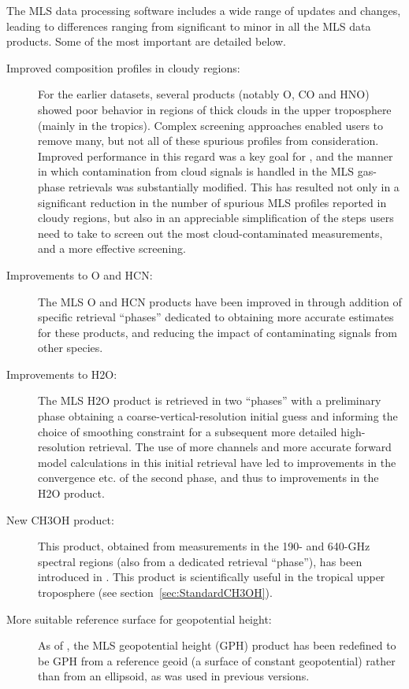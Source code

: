 \documentclass[11pt,draft]{report}
\begin{document}
The MLS \thisv data processing software includes a wide range of updates
and changes, leading to differences ranging from significant to minor in
all the MLS data products.  Some of the most important are detailed
below.

\begin{description}
\item[Improved composition profiles in cloudy regions:] For the earlier
  \prevv datasets, several products (notably O, CO and HNO)
  showed poor behavior in regions of thick clouds in the upper
  troposphere (mainly in the tropics).  Complex screening approaches
  enabled users to remove many, but not all of these spurious profiles
  from consideration.  Improved performance in this regard was a key
  goal for \thisv, and the manner in which contamination from cloud
  signals is handled in the MLS gas-phase retrievals was substantially
  modified.  This has resulted not only in a significant reduction in
  the number of spurious MLS profiles reported in cloudy regions, but
  also in an appreciable simplification of the steps users need to take
  to screen out the most cloud-contaminated measurements, and a more
  effective screening.

\item[Improvements to O and HCN:] The MLS O and HCN products
  have been improved in \thisv through addition of specific retrieval
  ``phases'' dedicated to obtaining more accurate estimates for these
  products, and reducing the impact of contaminating signals from other
  species.

\item[Improvements to H\cs2O:] The MLS H\cs2O product is retrieved in
  two ``phases'' with a preliminary phase obtaining a
  coarse-vertical-resolution initial guess and informing the choice of
  smoothing constraint for a subsequent more detailed high-resolution
  retrieval.  The use of more channels and more accurate forward model
  calculations in this initial retrieval have led to improvements in the
  convergence etc. of the second phase, and thus to improvements in the
  H\cs2O product.

\item[New CH\cs3OH product:] This product, obtained from measurements in
  the 190- and 640-GHz spectral regions (also from a dedicated retrieval
  ``phase''), has been introduced in \thisv.  This product is
  scientifically useful in the tropical upper troposphere (see
  section~\ref{sec:StandardCH3OH}).

\item[More suitable reference surface for geopotential height:] As of
  \thisv, the MLS geopotential height (GPH) product has been redefined
  to be GPH from a reference geoid (a surface of constant geopotential)
  rather than from an ellipsoid, as was used in previous versions.


\end{description}
\end{document}
